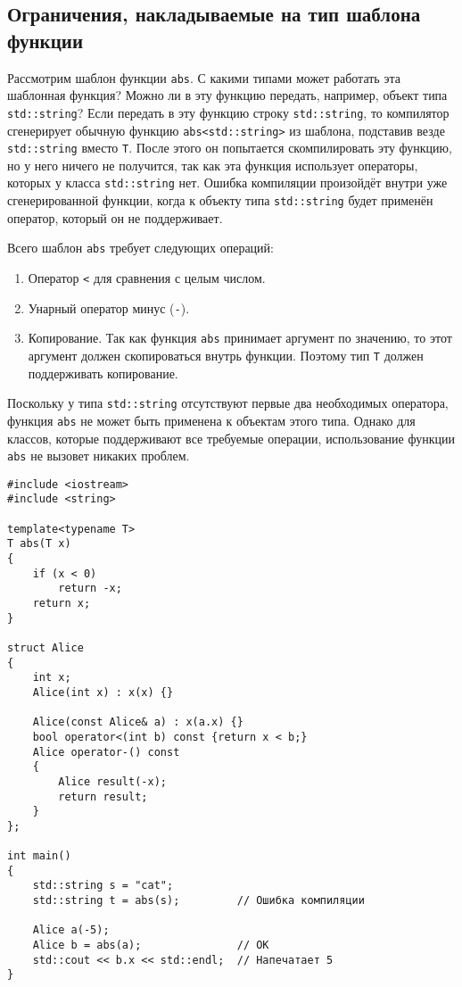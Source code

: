 \documentclass{article}
\begin{document}
\subsection*{Ограничения, накладываемые на тип шаблона функции}
Рассмотрим шаблон функции \texttt{abs}.
С какими типами может работать эта шаблонная функция? Можно ли в эту функцию передать, например, объект типа \texttt{std::string}? Если передать в эту функцию строку \texttt{std::string}, то компилятор сгенерирует обычную функцию \texttt{abs<std::string>} из шаблона, подставив везде \texttt{std::string} вместо \texttt{T}. После этого он попытается скомпилировать эту функцию, но у него ничего не получится, так как эта функция использует операторы, которых у класса \texttt{std::string} нет. Ошибка компиляции произойдёт внутри уже сгенерированной функции, когда к объекту типа \texttt{std::string} будет применён оператор, который он не поддерживает.

Всего шаблон \texttt{abs} требует следующих операций:
\begin{enumerate}
\item Оператор \texttt{<} для сравнения с целым числом.
\item Унарный оператор минус (\texttt{-}).
\item Копирование. Так как функция \texttt{abs} принимает аргумент по значению, то этот аргумент должен скопироваться внутрь функции. Поэтому тип \texttt{T} должен поддерживать копирование.
\end{enumerate}
Поскольку у типа \texttt{std::string} отсутствуют первые два необходимых оператора, функция \texttt{abs} не может быть применена к объектам этого типа. Однако для классов, которые поддерживают все требуемые операции, использование функции \texttt{abs} не вызовет никаких проблем.

\begin{lstlisting}
#include <iostream>
#include <string>

template<typename T>
T abs(T x)
{
	if (x < 0)
		return -x;
	return x;
}

struct Alice
{
	int x;
	Alice(int x) : x(x) {}
	
	Alice(const Alice& a) : x(a.x) {}
	bool operator<(int b) const {return x < b;}
	Alice operator-() const
	{
		Alice result(-x);
		return result;
	}
};

int main()
{
	std::string s = "cat";
	std::string t = abs(s);         // Ошибка компиляции
	
	Alice a(-5);            
	Alice b = abs(a);               // OK
	std::cout << b.x << std::endl;  // Напечатает 5
}
\end{lstlisting}
\end{document}
